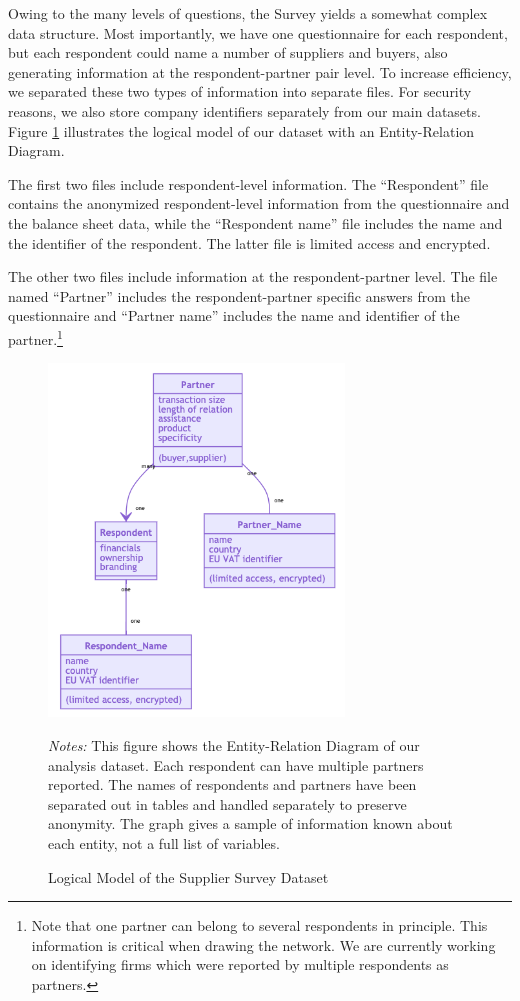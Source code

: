 \documentclass[final, dvipsnames, authoryear,12pt]{elsarticle}
\begin{document}
Owing to the many levels of questions, the Survey yields a somewhat complex data structure. Most importantly, we have one questionnaire for each respondent, but each respondent could name a number of suppliers and buyers, also generating information at the respondent-partner pair level. To increase efficiency, we separated these two types of information into separate files. For security reasons, we also store company identifiers separately from our main datasets. Figure \ref{fig:ERD} illustrates the logical model of our dataset with an Entity-Relation Diagram.

The first two files include respondent-level information. The ``Respondent'' file contains the anonymized respondent-level information from the questionnaire and the balance sheet data, while the ``Respondent name'' file includes the name and the identifier of the respondent. The latter file is limited access and encrypted.

The other two files include information at the respondent-partner level. The file named ``Partner'' includes the respondent-partner specific answers from the questionnaire and ``Partner name'' includes the name and identifier of the partner.\footnote{Note that one partner can belong to several respondents in principle. This information is critical when drawing the network. We are currently working on identifying firms which were reported by multiple respondents as partners.}

\begin{figure}[!h]
    \caption{Logical Model of the Supplier Survey Dataset}
    \label{fig:ERD} 
    \begin{center}    
    \includegraphics[width=0.7\textwidth]{graphs/ERD.png}
     \end{center}    
        {\scriptsize \textit{Notes:} This figure shows the Entity-Relation Diagram of our analysis dataset. Each respondent can have multiple partners reported. The names of respondents and partners have been separated out in tables and handled separately to preserve anonymity. The graph gives a sample of information known about each entity, not a full list of variables.} 
\end{figure}
\end{document}
